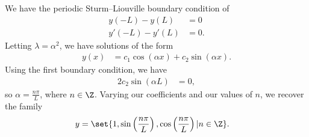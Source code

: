 \documentclass[10pt]{mypackage}
\begin{document}
\begin{solution}[11.4, Problem 4]
  We have the periodic Sturm--Liouville boundary condition of
  \begin{align*}
    y\left(-L\right) - y\left(L\right) &= 0\\
    y'\left(-L\right) - y'\left(L\right) &= 0.
  \end{align*}
  Letting $\lambda = \alpha^2$, we have solutions of the form
  \begin{align*}
    y(x) &= c_1\cos\left( \alpha x \right) + c_2\sin\left( \alpha x \right).
  \end{align*}
  Using the first boundary condition, we have
  \begin{align*}
    2c_2\sin\left( \alpha L \right) &= 0,
  \end{align*}
  so $\alpha = \frac{n\pi}{L}$, where $n\in\Z$. Varying our coefficients and our values of $n$, we recover the family
  \begin{align*}
    y &= \set{1,\sin\left( \frac{n\pi}{L} \right),\cos\left( \frac{n\pi}{L} \right) | n\in\Z}.
  \end{align*}
\end{solution}
\end{document}
